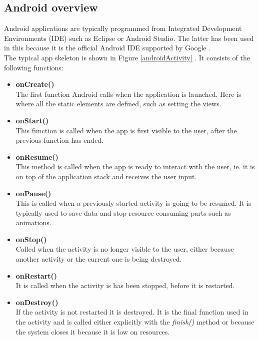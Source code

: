 \subsection{Android overview}

Android applications are typically programmed from Integrated Development Environments (IDE) such as  Eclipse or Android Studio. The latter has been used in this because it is the official Android IDE supported by Google \cite{component16}.\\

The typical app skeleton is shown in Figure \ref{androidActivity} \cite{component17}. It consists of the following functions:

	\begin{itemize}

	\item \textbf{onCreate()} \hfill \\
	The first function Android calls when the application is launched. Here is where all the static elements are defined, such as setting the views.
	
	\item \textbf{onStart()} \hfill \\
	This function is called when the app is first visible to the user, after the previous function has ended.


	\item \textbf{onResume()} \hfill \\
	This method is called when the app is ready to interact with the user, ie. it is on top of the application stack and receives the user input.

	\item \textbf{onPause()} \hfill \\
	This is called when a previously started activity is going to be resumed. It is typically used to save data and stop resource consuming parts such as animations.

	\item \textbf{onStop()} \hfill \\
	Called when the activity is no longer visible to the user, either because another activity or the current one is being destroyed.

	\item \textbf{onRestart()} \hfill \\
	It is called when the activity is has been stopped, before it is restarted.

	\item \textbf{onDestroy()} \hfill \\
	If the activity is not restarted it is destroyed. It is the final function used in the activity and is called either explicitly with the \textit{finish()} method or because the system closes it because it is low on resources.


	\end{itemize}
	\bigskip
	
